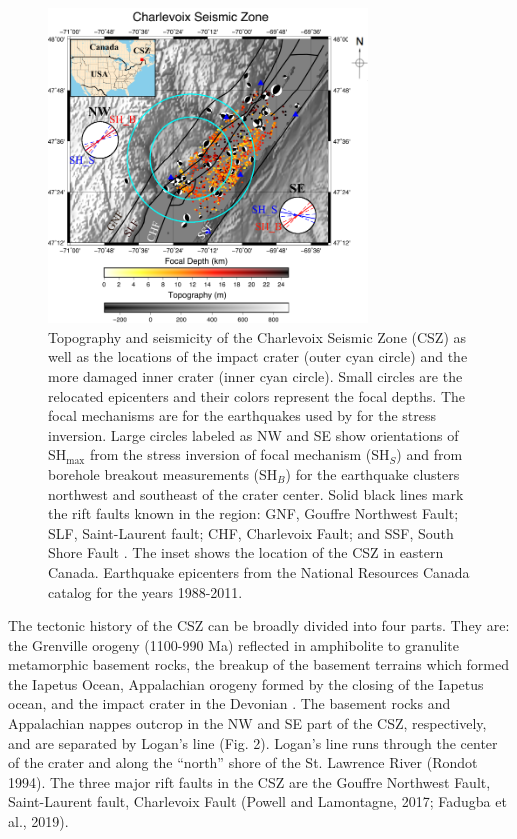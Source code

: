 \documentclass[draft]{agujournal2018}
\begin{document}
\begin{figure}[h]
\centering
\includegraphics[width=20pc]{Figures/Map_of_CSV_now_w_sta.png} 
\caption{Topography and seismicity of the Charlevoix Seismic Zone (CSZ) as well as the locations of the impact crater (outer cyan circle) and the more damaged inner crater (inner cyan circle). Small circles are the relocated epicenters \citep{Powell_2017} and their colors represent the focal depths. The focal mechanisms are for the earthquakes used by \citet{Mazzotti_2010} for the stress inversion. Large circles labeled as NW and SE show orientations of SH$_{\max}$ from the stress inversion of focal mechanism (SH$_S$) and from borehole breakout measurements (SH$_B$) for the earthquake clusters northwest and southeast of the crater center. Solid black lines mark the rift faults known in the region: GNF, Gouffre Northwest Fault; SLF, Saint-Laurent fault; CHF, Charlevoix Fault; and SSF, South Shore Fault \citep{Rondot_1971,lamontagne1999}. The inset shows the location of the CSZ in eastern Canada. Earthquake epicenters from the National Resources Canada catalog for the years 1988-2011.}
\label{figone}
\end{figure}


The tectonic history of the CSZ can be broadly divided into four parts. They are: the Grenville orogeny (1100-990 Ma) reflected in amphibolite to granulite metamorphic basement rocks, the breakup of the basement terrains which formed the Iapetus Ocean, Appalachian orogeny formed by the closing of the Iapetus ocean, and the impact crater in the Devonian \citep{Rondot_1971,RONDOT_2000,Baird_2010,}. The basement rocks and Appalachian nappes outcrop in the NW and SE part of the CSZ, respectively, and are separated by Logan’s line (Fig. 2). Logan’s line runs through the center of the crater and along the “north” shore of the St. Lawrence River (Rondot 1994). The three major rift faults in the CSZ are the Gouffre Northwest Fault, Saint-Laurent fault, Charlevoix Fault (Powell and Lamontagne, 2017; Fadugba et al., 2019). 
\end{document}
